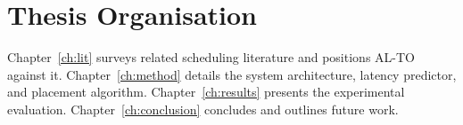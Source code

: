 \section{Thesis Organisation}
Chapter~\ref{ch:lit} surveys related scheduling literature and positions AL-TO against it. Chapter~\ref{ch:method} details the system architecture, latency predictor, and placement algorithm. Chapter~\ref{ch:results} presents the experimental evaluation. Chapter~\ref{ch:conclusion} concludes and outlines future work.
